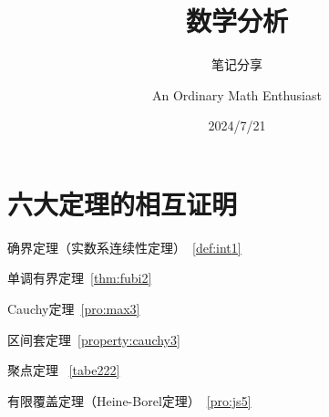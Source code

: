\documentclass[lang=cn,newtx,10pt,scheme=chinese]{elegantbook}
\title{数学分析}
\subtitle{笔记分享}
\author{An Ordinary Math Enthusiast}
\institute{CHINA}
\date{2024/7/21}
\begin{document}
\maketitle
\frontmatter

\tableofcontents

\mainmatter

\chapter{六大定理的相互证明}

\begin{introduction}
  \item 确界定理（实数系连续性定理）~\ref{def:int1}
  \item 单调有界定理~\ref{thm:fubi2}
  \item Cauchy定理~\ref{pro:max3}
  \item 区间套定理~\ref{property:cauchy3}
  \item 聚点定理 ~\ref{tabe222}
  \item 有限覆盖定理（Heine-Borel定理）~\ref{pro:js5}
\end{introduction}
\end{document}
